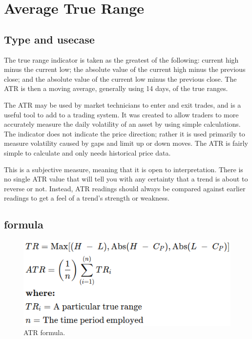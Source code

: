 \documentclass[12pt,a4paper]{article}
\begin{document}
\section{Average True Range}

\subsection{Type and usecase}
The true range indicator is taken as the greatest of the following: current high minus the current low; the absolute value of the current high minus the previous close; and the absolute value of the current low minus the previous close. The ATR is then a moving average, generally using 14 days, of the true ranges.

The ATR may be used by market technicians to enter and exit trades, and is a useful tool to add to a trading system. It was created to allow traders to more accurately measure the daily volatility of an asset by using simple calculations. The indicator does not indicate the price direction; rather it is used primarily to measure volatility caused by gaps and limit up or down moves. The ATR is fairly simple to calculate and only needs historical price data.

This is a subjective measure, meaning that it is open to interpretation. There is no single ATR value that will tell you with any certainty that a trend is about to reverse or not. Instead, ATR readings should always be compared against earlier readings to get a feel of a trend's strength or weakness.

\subsection{formula}

\begin{figure}[H]
    \includegraphics[scale=0.7]{../images/ATR.png}
    \caption{ATR formula.}
    \label{fig:ATR}
\end{figure}
\end{document}
